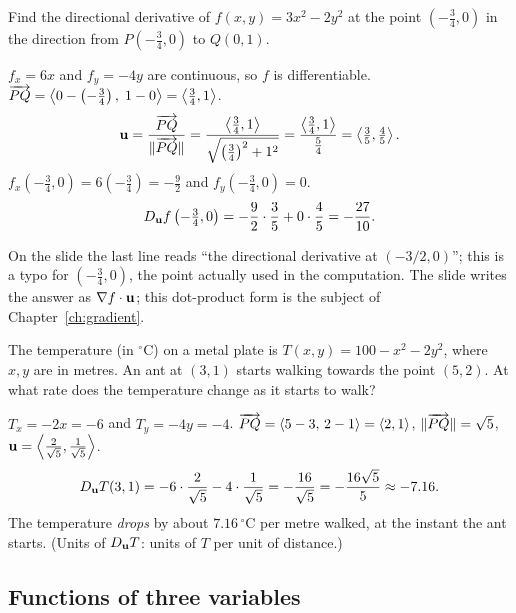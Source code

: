 \begin{example}\label{ex:6.4}
Find the directional derivative of $f(x,y)=3x^2-2y^2$ at the point
$\left(-\tfrac34,0\right)$ in the direction from $P\left(-\tfrac34,0\right)$ to
$Q(0,1)$.
\end{example}
\begin{solution}
 $f_x=6x$ and $f_y=-4y$ are continuous, so $f$ is
differentiable.
$\overrightarrow{PQ}=\left\langle 0-\left(-\tfrac34\right),\;1-0 \right\rangle=\left\langle \tfrac34,1 \right\rangle$.
\[
  \mathbf{u}=\frac{\overrightarrow{PQ}}{\lVert\overrightarrow{PQ}\rVert}=\frac{\left\langle \frac34,1 \right\rangle}{\sqrt{\left(\frac34\right)^2+1^2}}
  =\frac{\left\langle \frac34,1 \right\rangle}{\frac54}=\left\langle \tfrac35,\tfrac45 \right\rangle.
\]
 $f_x\left(-\tfrac34,0\right)=6\left(-\tfrac34\right)=-\tfrac92$ and
$f_y\left(-\tfrac34,0\right)=0$.
\[
  D_{\mathbf{u}} f\left(-\tfrac34,0\right)=-\frac92\cdot\frac35+0\cdot\frac45=-\frac{27}{10}.
\]
\end{solution}

\begin{remark}
On the slide the last line reads ``the directional derivative at $(-3/2,0)$'';
this is a typo for $(-\tfrac34,0)$, the point actually used in the
computation. The slide writes the answer as $\nabla f\cdot\mathbf{u}$; this
dot-product form is the subject of Chapter~\ref{ch:gradient}.
\end{remark}

\begin{example}\label{ex:temp}
The temperature (in $^\circ$C) on a metal plate is $T(x,y)=100-x^2-2y^2$, where
$x,y$ are in metres. An ant at $(3,1)$ starts walking towards the point
$(5,2)$. At what rate does the temperature change as it starts to walk?
\end{example}
\begin{solution}
 $T_x=-2x=-6$ and $T_y=-4y=-4$.
 $\overrightarrow{PQ}=\left\langle 5-3,\,2-1 \right\rangle=\left\langle 2,1 \right\rangle$, $\lVert\overrightarrow{PQ}\rVert=\sqrt5$,
$\mathbf{u}=\left\langle \tfrac{2}{\sqrt5},\tfrac{1}{\sqrt5} \right\rangle$.
\[
  D_{\mathbf{u}} T(3,1)=-6\cdot\frac{2}{\sqrt5}-4\cdot\frac{1}{\sqrt5}=-\frac{16}{\sqrt5}=-\frac{16\sqrt5}{5}\approx-7.16 .
\]
The temperature \emph{drops} by about $7.16\,^\circ$C per metre walked, at the
instant the ant starts. (Units of $D_{\mathbf{u}} T$: units of $T$ per unit of distance.)
\end{solution}

\subsection{Functions of three variables}

